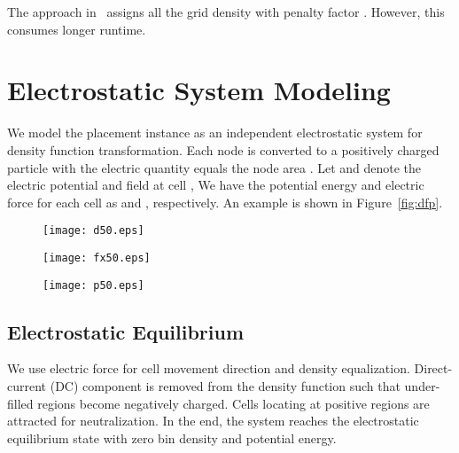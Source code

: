 \documentclass[conference,10pt]{IEEEtran}
\begin{document}
The approach in~\cite{mpl6}
assigns all the grid density  
with penalty factor .
However, this consumes longer runtime.



\section{Electrostatic System Modeling}
\label{sec:new}

We model the placement instance as an 
independent electrostatic system for 
density function transformation. 
Each node  is converted to a
positively charged particle with  
the electric quantity  equals
the node area . 
Let  and  denote the 
electric potential and field at cell ,  
We have the potential energy and electric force 
for each cell as  
and , respectively.
An example is shown in Figure~\ref{fig:dfp}.
\begin{figure*}\centering
  \begin{subfigure}[b]{0.33\textwidth}
    \centering
    \texttt{[image: d50.eps]}
    \caption{}
    \label{subfig:den}
  \end{subfigure}
  \begin{subfigure}[b]{0.33\textwidth}
    \centering
    \texttt{[image: fx50.eps]}
    \caption{}
    \label{subfig:field}
  \end{subfigure}\begin{subfigure}[b]{0.33\textwidth}
    \centering
    \texttt{[image: p50.eps]}
    \caption{}
    \label{subfig:phi}
  \end{subfigure}
  \caption{The distribution of electric (a) density (b) field (c) potential without filler insertion. Snapshots are extracted at iteration 50 of ADAPTEC1.} 
\label{fig:dfp}
\end{figure*}


\subsection{Electrostatic Equilibrium}

We use electric force for cell movement direction
and density equalization. 
Direct-current (DC) component is removed
from the density function such that 
under-filled regions become negatively charged. 
Cells locating at positive regions are 
attracted for neutralization.
In the end, the system reaches the electrostatic 
equilibrium state with zero bin density and potential 
energy.
\end{document}
